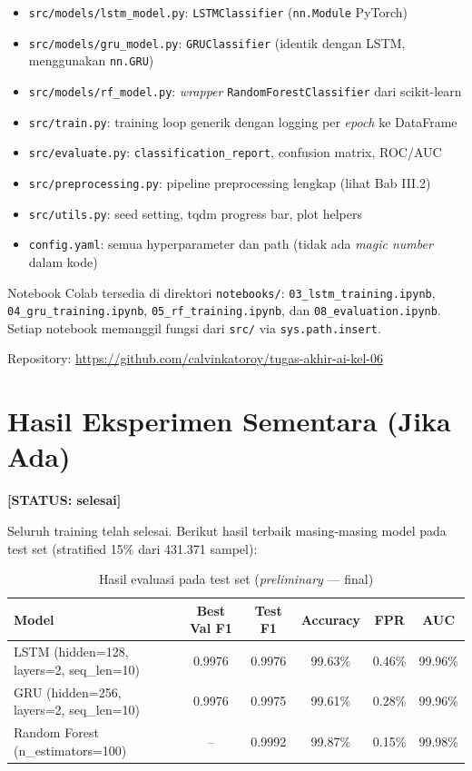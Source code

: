 \documentclass[11pt,a4paper,oneside]{report}
\newcommand{\statusbox}[1]{\textbf{[STATUS: #1]}}
\begin{document}
\begin{itemize}[leftmargin=*]
    \item \texttt{src/models/lstm\_model.py}: \texttt{LSTMClassifier} (\texttt{nn.Module} PyTorch)
    \item \texttt{src/models/gru\_model.py}: \texttt{GRUClassifier} (identik dengan LSTM, menggunakan \texttt{nn.GRU})
    \item \texttt{src/models/rf\_model.py}: \textit{wrapper} \texttt{RandomForestClassifier} dari scikit-learn
    \item \texttt{src/train.py}: training loop generik dengan logging per \textit{epoch} ke DataFrame
    \item \texttt{src/evaluate.py}: \texttt{classification\_report}, confusion matrix, ROC/AUC
    \item \texttt{src/preprocessing.py}: pipeline preprocessing lengkap (lihat Bab III.2)
    \item \texttt{src/utils.py}: seed setting, tqdm progress bar, plot helpers
    \item \texttt{config.yaml}: semua hyperparameter dan path (tidak ada \textit{magic number} dalam kode)
\end{itemize}

Notebook Colab tersedia di direktori \texttt{notebooks/}: \texttt{03\_lstm\_training.ipynb}, \texttt{04\_gru\_training.ipynb}, \texttt{05\_rf\_training.ipynb}, dan \texttt{08\_evaluation.ipynb}. Setiap notebook memanggil fungsi dari \texttt{src/} via \texttt{sys.path.insert}.

Repository: \url{https://github.com/calvinkatoroy/tugas-akhir-ai-kel-06}

\section{Hasil Eksperimen Sementara (Jika Ada)}

\statusbox{selesai}

Seluruh training telah selesai. Berikut hasil terbaik masing-masing model pada test set (stratified 15\% dari 431.371 sampel):

\begin{table}[h!]
\centering
\caption{Hasil evaluasi pada test set (\textit{preliminary} --- final)}
\label{tab:hasil-sementara}
\begin{tabular}{lccccc}
\toprule
\textbf{Model} & \textbf{Best Val F1} & \textbf{Test F1} & \textbf{Accuracy} & \textbf{FPR} & \textbf{AUC} \\
\midrule
LSTM (hidden=128, layers=2, seq\_len=10) & 0.9976 & 0.9976 & 99.63\% & 0.46\% & 99.96\% \\
GRU (hidden=256, layers=2, seq\_len=10)  & 0.9976 & 0.9975 & 99.61\% & 0.28\% & 99.96\% \\
Random Forest (n\_estimators=100)        & --     & 0.9992 & 99.87\% & 0.15\% & 99.98\% \\
\bottomrule
\end{tabular}
\end{table}
\end{document}
